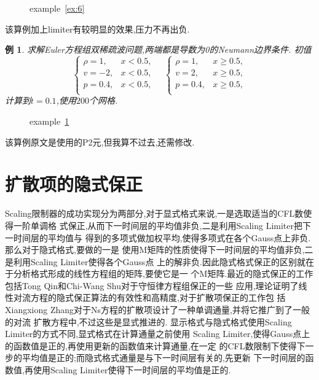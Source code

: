 \documentclass[a4paper, 11pt]{ctexart}
\numberwithin{equation}{section}
\numberwithin{figure}{section}
\newtheorem{example}{例}
\begin{document}
\begin{figure}[H]
  \centering
\caption{example~\ref{ex:6}}
\end{figure}
该算例加上limiter有较明显的效果,压力不再出负.

\begin{example}\label{ex:7}
  求解Euler方程组双稀疏波问题,两端都是导数为0的Neumann边界条件.
  初值
  \begin{equation}
    \begin{cases}
      \rho=1, & x<0.5,\\
      v=-2, & x<0.5,\\
      p=0.4, & x<0.5,\\
    \end{cases}\quad
    \begin{cases}
      \rho=1, & x\geqslant0.5,\\
      v=2, & x\geqslant0.5,\\
      p=0.4, & x\geqslant0.5,\\
    \end{cases}
  \end{equation}
  计算到$t=0.1$,使用$200$个网格.
\end{example}

\begin{figure}[H]
  \centering
\caption{example~\ref{ex:7}}
\end{figure}

该算例原文是使用的P2元,但我算不过去,还需修改.


\section{扩散项的隐式保正}
Scaling限制器的成功实现分为两部分,对于显式格式来说,一是选取适当的CFL数使得一阶单调格
式保正,从而下一时间层的平均值非负,二是利用Scaling Limiter把下一时间层的平均值与
得到的多项式做加权平均,使得多项式在各个Gauss点上非负.那么对于隐式格式,要做的一是
使用M矩阵的性质使得下一时间层的平均值非负,二是利用Scaling Limiter使得各个Gauss点
上的解非负.因此隐式格式保正的区别就在于分析格式形成的线性方程组的矩阵,要使它是一
个M矩阵.最近的隐式保正的工作包括Tong Qin和Chi-Wang Shu对于守恒律方程组保正的一些
应用,理论证明了线性对流方程的隐式保正算法的有效性和高精度,对于扩散项保正的工作包
括Xiangxiong Zhang对于Ns方程的扩散项设计了一种单调通量,并将它推广到了一般的对流
扩散方程中,不过这些是显式推进的.
显示格式与隐式格式使用Scaling Limiter的方式不同,显式格式在计算通量之前使用
Scaling Limiter,使得Gauss点上的函数值是正的,再使用更新的函数值来计算通量,在一定
的CFL数限制下使得下一步的平均值是正的;而隐式格式通量是与下一时间层有关的,先更新
下一时间层的函数值,再使用Scaling Limiter使得下一时间层的平均值是正的.
\end{document}
